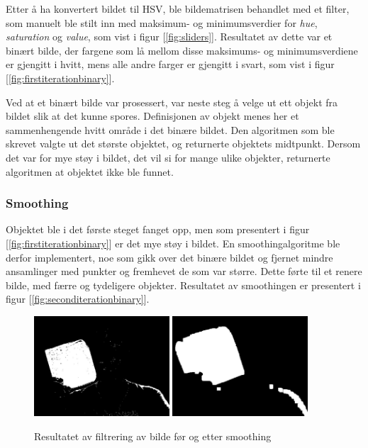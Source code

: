 Etter å ha konvertert bildet til HSV, ble bildematrisen behandlet med et filter, som manuelt ble stilt inn med maksimum- og minimumsverdier for \emph{hue}, \emph{saturation} og \emph{value}, som vist i figur [\ref{fig:sliders}]. Resultatet av dette var et binært bilde, der fargene som lå mellom disse maksimums- og minimumsverdiene er gjengitt i hvitt, mens alle andre farger er gjengitt i svart, som vist i figur [\ref{fig:firstiterationbinary}].

Ved at et binært bilde var prosessert, var neste steg å velge ut ett objekt fra bildet slik at det kunne spores. Definisjonen av objekt menes her et sammenhengende hvitt område i det binære bildet. Den algoritmen som ble skrevet valgte ut det største objektet, og returnerte objektets midtpunkt. Dersom det var for mye støy i bildet, det vil si for mange ulike objekter, returnerte algoritmen at objektet ikke ble funnet.

\subsubsection{Smoothing}

Objektet ble i det første steget fanget opp, men som presentert i figur [\ref{fig:firstiterationbinary}] er det mye støy i bildet. En smoothingalgoritme ble derfor implementert, noe som gikk over det binære bildet og fjernet mindre ansamlinger med punkter og fremhevet de som var større. Dette førte til et renere bilde, med færre og tydeligere objekter. Resultatet av smoothingen er presentert i figur [\ref{fig:seconditerationbinary}].

\begin{figure}[!ht]
	\centering
	{\includegraphics[width=0.45\textwidth]{img/first-binary.jpg}}
	{\includegraphics[width=0.45\textwidth]{img/second-binary.jpg}}
	\caption{Resultatet av filtrering av bilde før og etter smoothing}
\end{figure}

